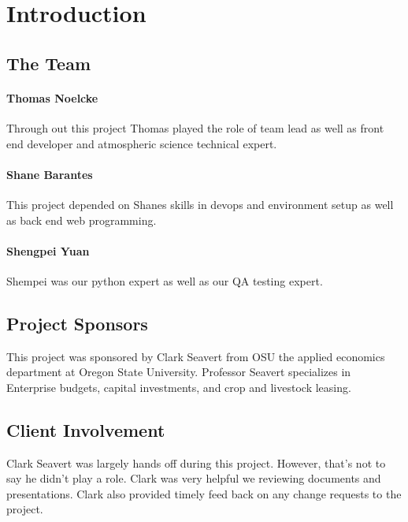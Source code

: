 \documentclass[onecolumn, draftclsnofoot,10pt, compsoc]{article}
\begin{document}
\newpage
{}
\tableofcontents
\newpage
\clearpage

\section{Introduction}

		\subsection{The Team}
		    \paragraph{Thomas Noelcke} Through out this project Thomas played the role of team lead as well as front end developer and atmospheric science technical expert.\\
		    
		    \paragraph{Shane Barantes} This project depended on Shanes skills in devops and environment setup as well as back end web programming.\\
		    
		    \paragraph{Shengpei Yuan} Shempei was our python expert as well as our QA testing expert.\\
		    
		\subsection{Project Sponsors}
		    This project was sponsored by Clark Seavert from OSU the applied economics department at Oregon State University. Professor Seavert specializes in Enterprise budgets, capital investments, and crop and livestock leasing.\\
		    
        \subsection{Client Involvement} 
            Clark Seavert was largely hands off during this project. However, that's not to say he didn't play a role. Clark was very helpful we reviewing documents and presentations. Clark also provided timely feed back on any change requests to the project.\\
            
\end{document}
